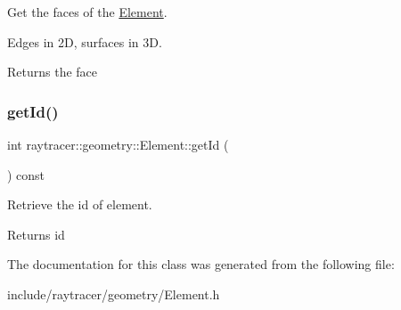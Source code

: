 Get the faces of the \hyperlink{classraytracer_1_1geometry_1_1Element}{Element}. 

Edges in 2D, surfaces in 3D. \begin{DoxyReturn}{Returns}
the face 
\end{DoxyReturn}
\mbox{\label{classraytracer_1_1geometry_1_1Element_ad0780e2bf5e9b3f6918838e9db384e5f}} 
\subsubsection{\texorpdfstring{get\+Id()}{getId()}}
{\footnotesize\ttfamily int raytracer\+::geometry\+::\+Element\+::get\+Id (\begin{DoxyParamCaption}{ }\end{DoxyParamCaption}) const}



Retrieve the id of element. 

\begin{DoxyReturn}{Returns}
id 
\end{DoxyReturn}


The documentation for this class was generated from the following file\+:\begin{DoxyCompactItemize}
\item 
include/raytracer/geometry/Element.\+h\end{DoxyCompactItemize}
